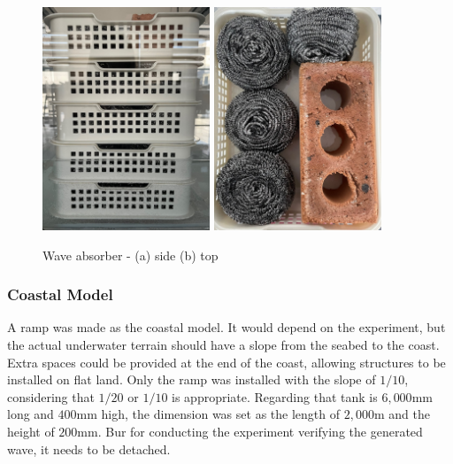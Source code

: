 \begin{figure}[H]
    \begin{center}
        \includegraphics[width=5cm]{images/Wave_Absorber(Side).jpg}
        \includegraphics[width=5cm]{images/Wave_Absorber(Top).jpg}
    \end{center}
        \caption{Wave absorber - (a) side (b) top}
        \label{Experimnet_System} 
\end{figure}

\subsubsection{Coastal Model}%

A ramp was made as the coastal model. It would depend on the experiment, but the actual underwater terrain should have a slope from the seabed to the coast. Extra spaces could be provided at the end of the coast, allowing structures to be installed on flat land. Only the ramp was installed with the slope of $1/10$, considering that $1/20$ or $1/10$ is appropriate. Regarding that tank is $6,000\mathrm{mm}$ long and $400\mathrm{mm}$ high, the dimension was set as the length of $2,000\mathrm{m}$ and the height of $200\mathrm{mm}$. Bur for conducting the experiment verifying the generated wave, it needs to be detached.

